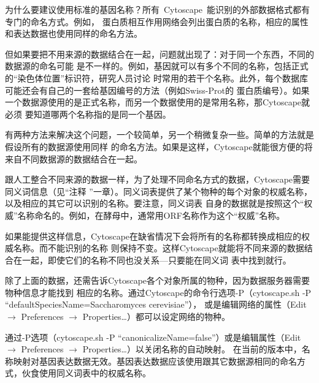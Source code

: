 为什么要建议使用标准的基因名称？所有~Cytoscape~能识别的外部数据格式都有专门的命名方式。例如，
蛋白质相互作用网络会列出蛋白质的名称，相应的属性和表达数据也使用同样的命名方法。

但如果要把不用来源的数据结合在一起，问题就出现了：对于同一个东西，不同的数据源的命名可能
是不一样的。例如，基因就可以有多个不同的名称，包括正式的``染色体位置''标识符，研究人员讨论
时常用的若干个名称。此外，每个数据库可能还会有自己的一套给基因编号的方法（例如Swiss-Prot的
蛋白质编号）。如果一个数据源使用的是正式名称，而另一个数据使用的是常用名称，那Cytoscape就必须
要知道哪两个名称指的是同一个基因。

有两种方法来解决这个问题，一个较简单，另一个稍微复杂一些。简单的方法就是假设所有的数据源使用同样
的命名方法。如果是这样，Cytoscape就能很方便的将来自不同数据源的数据结合在一起。

跟人工整合不同来源的数据一样，为了处理不同命名方式的数据，Cytoscape需要同义词信息（见``注释
''一章）。同义词表提供了某个物种的每个对象的权威名称，以及相应的其它可以识别的名称。要注意，同义词表
自身的数据就是按照这个``权威''名称命名的。例如，在酵母中，通常用ORF名称作为这个``权威''名称。

如果能提供这样信息，Cytoscape在缺省情况下会将所有的名称都转换成相应的权威名称。而不能识别的名称
则保持不变。这样Cytoscape就能将不同来源的数据结合在一起，即使它们的名称不同也没关系---只要能在同义词
表中找到就行。

除了上面的数据，还需告诉Cytoscape各个对象所属的物种，因为数据服务器需要物种信息才能找到
相应的名称。通过Cytoscape的命令行选项-P（cytoscape.sh -P ``defaultSpeciesName=Saccharomyces
cerevisiae''）， 或是编辑网络的属性（Edit $\rightarrow$ Preferences
$\rightarrow$ Properties\ldots）都可以设定网络的物种。 

通过-P选项（cytoscape.sh -P ``canonicalizeName=false''）或是编辑属性（Edit
$\rightarrow$ Preferences $\rightarrow$
Properties\ldots）以关闭名称的自动映射。
在当前的版本中，名称映射对基因表达数据无效。基因表达数据应该使用跟其它数据源相同的命名方式，伙食使用同义词表中的权威名称。
